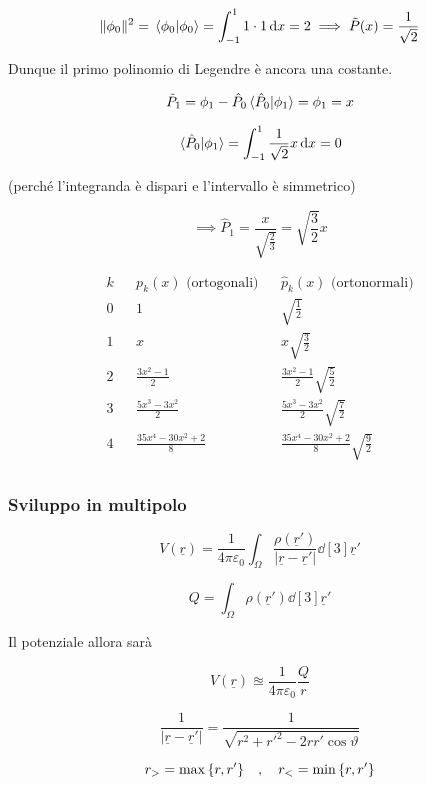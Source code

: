 $$\| \phi_0 \|^2
=\braket*{\phi_0}{\phi_0}
=\int_{-1}^{1} 1 \cdot 1 \dd{x}=2
\implies
\tilde{P}(x)=\frac{1}{\sqrt{2}}$$

Dunque il primo polinomio di Legendre è ancora una costante.

$$\tilde{P}_1=\phi_1 - \hat{P}_0 \braket*{\hat{P}_0}{\phi_1}=\phi_1=x$$

$$\braket*{\hat{P}_0}{\phi_1}=\int_{-1}^{1} \frac{1}{\sqrt{2}} x \dd{x}=0$$

(perché l'integranda è dispari e l'intervallo è simmetrico)

$$\implies \hat{P}_1
=\frac{x}{\displaystyle \sqrt{\frac{2}{3}}}
=\sqrt{\frac{3}{2}}x$$

$$
\begin{array}{lcccc}
   k && p_k(x) \text{ (ortogonali)} && \hat{p}_k(x) \text{ (ortonormali)}\\[0.2cm]
   0 && 1 && \displaystyle \sqrt{\frac{1}{2}}\\[0.4cm]
   1 && x && \displaystyle x \sqrt{\frac{3}{2}}\\[0.4cm]
   2 && \displaystyle \frac{3x^2 - 1}{2} && \displaystyle \frac{3x^2 - 1}{2} \sqrt{\frac{5}{2}}\\[0.4cm]
   3 && \displaystyle \frac{5x^3 - 3x^2}{2} && \displaystyle \frac{5x^3 - 3x^2}{2} \sqrt{\frac{7}{2}}\\[0.4cm]
   4 && \displaystyle \frac{35x^4 - 30 x^2 + 2}{8} && \displaystyle \frac{35x^4 - 30 x^2 + 2}{8} \sqrt{\frac{9}{2}}\\[0.4cm]
\end{array}$$

\subsubsection{Sviluppo in multipolo}

$$V(\underline{r})=\frac{1}{4 \pi \varepsilon_0} \int_{\Omega} \frac{\rho(\underline{r}')}{| \underline{r} - \underline{r}' |} \dd[3]{\underline{r}'}$$

$$Q=\int_{\Omega} \rho(\underline{r}') \dd[3]\underline{r}'$$

Il potenziale allora sarà

$$V(\underline{r}) \approxeq \frac{1}{4 \pi \varepsilon_0}\frac{Q}{r}$$

$$\frac{1}{| \underline{r} - \underline{r}' |}
=\frac{1}{\sqrt{r^2 + r'^2 - 2 r r' \cos{\vartheta}}}$$

$$r_{>}=\max \qty{r,r'}
\quad,\quad
r_{<}=\min \qty{r,r'}$$

